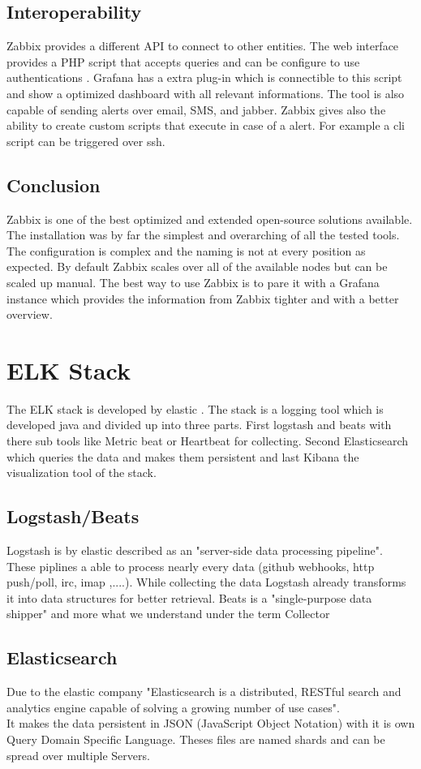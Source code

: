 \subsection{Interoperability}
Zabbix provides a different API to connect to other entities. The web interface  provides a PHP script that accepts queries and can be configure to use authentications . Grafana has a extra plug-in which is connectible to this script and show a optimized dashboard with all relevant informations. The tool is also capable of sending alerts over email, SMS, and jabber. Zabbix gives also the ability to create custom scripts that execute in case of a alert. For example a cli script can be triggered over ssh. 
\subsection{Conclusion}
Zabbix is one of the best optimized and extended open-source solutions available. The installation was by far the simplest and overarching of all the tested tools. The configuration is complex and the naming is not at every position as expected. By default Zabbix scales over all of the available nodes but can be scaled up manual. The best way to use Zabbix is to pare it with a Grafana instance which provides the information from Zabbix tighter and with a better overview.

\section{ELK Stack }
\label{elk} %
The ELK stack is developed by elastic \cite{elasticsearch}. 
The stack is a logging tool which is developed java and divided up into three parts. First  logstash and beats with there sub tools like Metric beat or Heartbeat for collecting. Second Elasticsearch which queries the data and makes them persistent and last Kibana the visualization tool of the stack.
\subsection{Logstash/Beats}
Logstash is by elastic described as an 
"server-side data processing pipeline"\cite{elasticsearch}. These piplines a able to process nearly every data (github webhooks, http push/poll, irc, imap ,....).
While collecting the data Logstash already transforms it into data structures for better retrieval.
Beats is a "single-purpose data shipper"\cite{elasticsearch} and more what we understand under the term Collector
\subsection{Elasticsearch}
\label{Elasticsearch}
Due to the elastic company "Elasticsearch is a distributed, RESTful search and analytics engine capable of solving a growing number of use cases"\cite{elasticsearch}.\\ It makes the data persistent in JSON (JavaScript Object Notation) with it is own Query Domain Specific Language. Theses files are named shards and can be spread over multiple Servers.
